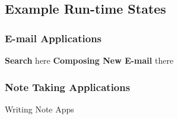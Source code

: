 \subsection{Example Run-time States}

\subsubsection{E-mail Applications}
\textbf{Search}
\newline
here
\newline
\textbf{Composing New E-mail}
\newline
there


\subsubsection{Note Taking Applications}
Writing Note Apps
 
